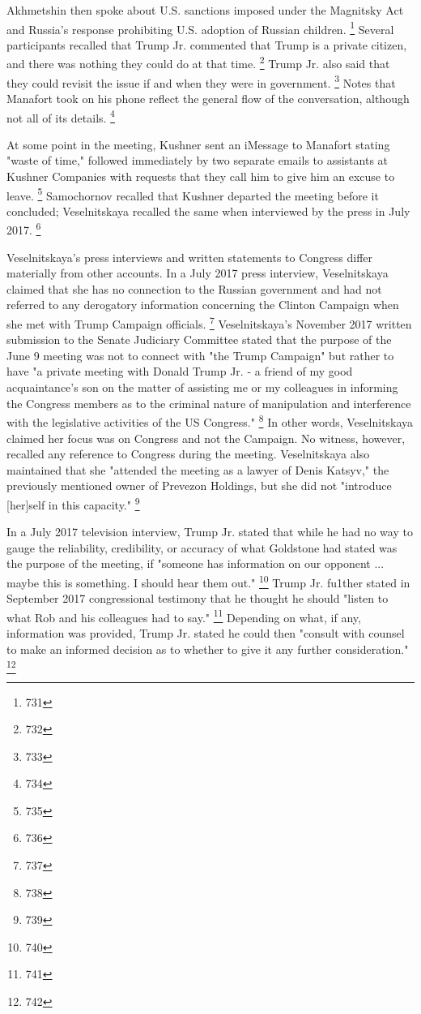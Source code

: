 Akhmetshin then spoke about U.S. sanctions imposed under the Magnitsky Act and Russia's response prohibiting U.S. adoption of Russian children.%
\footnote{731}
Several participants recalled that Trump Jr. commented that Trump is a private citizen, and there was nothing they could do at that time.%
\footnote{732}
Trump Jr. also said that they could revisit the issue if and when they were in government.%
\footnote{733}
Notes that Manafort took on his phone reflect the general flow of the conversation, although not all of its details.%
\footnote{734}

At some point in the meeting, Kushner sent an iMessage to Manafort stating "waste of time," followed immediately by two separate emails to assistants at Kushner Companies with requests that they call him to give him an excuse to leave.%
\footnote{735}
Samochornov recalled that Kushner departed the meeting before it concluded; Veselnitskaya recalled the same when interviewed by the press in July 2017.%
\footnote{736}

Veselnitskaya's press interviews and written statements to Congress differ materially from other accounts.
In a July 2017 press interview, Veselnitskaya claimed that she has no connection to the Russian government and had not referred to any derogatory information concerning the Clinton Campaign when she met with Trump Campaign officials.%
\footnote{737}
Veselnitskaya's November 2017 written submission to the Senate Judiciary Committee stated that the purpose of the June 9 meeting was not to connect with "the Trump Campaign" but rather to have "a private meeting with Donald Trump Jr. - a friend of my good acquaintance's son on the matter of assisting me or my colleagues in informing the Congress members as to the criminal nature of manipulation and interference with the legislative activities of the US Congress."%
\footnote{738}
In other words, Veselnitskaya claimed her focus was on Congress and not the Campaign.
No witness, however, recalled any reference to Congress during the meeting.
Veselnitskaya also maintained that she "attended the meeting as a lawyer of Denis Katsyv," the previously mentioned owner of Prevezon Holdings, but she did not "introduce [her]self in this capacity."%
\footnote{739}

In a July 2017 television interview, Trump Jr. stated that while he had no way to gauge the reliability, credibility, or accuracy of what Goldstone had stated was the purpose of the meeting, if "someone has information on our opponent ... maybe this is something.
I should hear them out."%
\footnote{740}
Trump Jr. fu1ther stated in September 2017 congressional testimony that he thought he should "listen to what Rob and his colleagues had to say."%
\footnote{741}
Depending on what, if any, information was provided, Trump Jr. stated he could then "consult with counsel to make an informed decision as to whether to give it any further consideration."%
\footnote{742}

